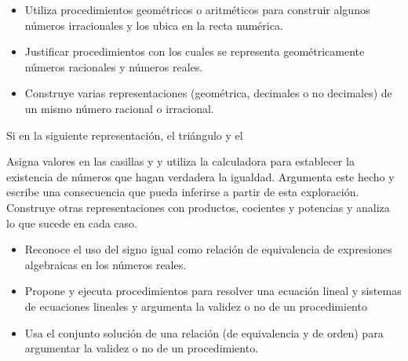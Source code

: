 
\evidencias

\begin{itemize}
  \item Utiliza procedimientos geométricos o aritméticos para construir algunos números irracionales y los ubica en la recta numérica.
  \item Justificar procedimientos con los cuales se representa geométricamente números racionales y números reales.
  \item Construye varias representaciones (geométrica, decimales o no decimales) de un mismo número racional o irracional.
\end{itemize}

\ejemplo

Si en la siguiente representación, el triángulo y el


Asigna valores en las casillas y y utiliza la calculadora para establecer la existencia de números que hagan verdadera la igualdad. Argumenta este hecho y escribe una consecuencia que pueda inferirse a partir de esta exploración. Construye otras representaciones con productos, cocientes y potencias y analiza lo que sucede en cada caso.



\evidencias

\begin{itemize}
  \item Reconoce el uso del signo igual como relación de equivalencia de expresiones algebraicas en los números reales.
  \item Propone y ejecuta procedimientos para resolver una ecuación lineal y sistemas de ecuaciones lineales y argumenta la validez o no de un procedimiento
  \item Usa el conjunto solución de una relación (de equivalencia y de orden) para argumentar la validez o no de un procedimiento.
\end{itemize}

